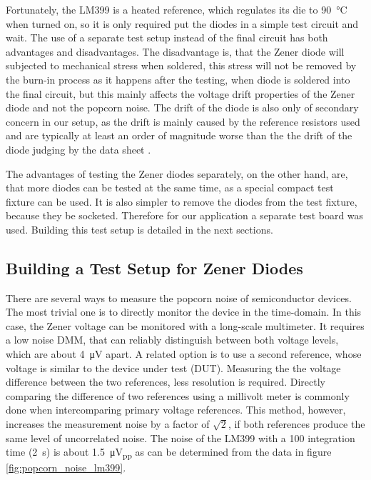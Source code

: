 Fortunately, the LM399 is a heated reference, which regulates its die to \qty{90}{\celsius} when turned on, so it is only required put the diodes in a simple test circuit and wait. The use of a separate test setup instead of the final circuit has both advantages and disadvantages. The disadvantage is, that the Zener diode will subjected to mechanical stress when soldered, this stress will not be removed by the burn-in process as it happens after the testing, when diode is soldered into the final circuit, but this mainly affects the voltage drift properties of the Zener diode and not the popcorn noise. The drift of the diode is also only of secondary concern in our setup, as the drift is mainly caused by the reference resistors used and are typically at least an order of magnitude worse than the the drift of the diode judging by the data sheet \cite{datasheet_LM399,datasheet_VPR}.

The advantages of testing the Zener diodes separately, on the other hand, are, that more diodes can be tested at the same time, as a special compact test fixture can be used. It is also simpler to remove the diodes from the test fixture, because they be socketed. Therefore for our application a separate test board was used. Building this test setup is detailed in the next sections.

\subsection{Building a Test Setup for Zener Diodes}
There are several ways to measure the popcorn noise of semiconductor devices. The most trivial one is to directly monitor the device in the time-domain. In this case, the Zener voltage can be monitored with a long-scale multimeter. It requires a low noise DMM, that can reliably distinguish between both voltage levels, which are about \qty{4}{\micro \volt} apart.
A related option is to use a second reference, whose voltage is similar to the device under test (DUT). Measuring the the voltage difference between the two references, less resolution is required. Directly comparing the difference of two references using a millivolt meter is commonly done when intercomparing primary voltage references. This method, however, increases the measurement noise by a factor of $\sqrt{2}$, if both references produce the same level of uncorrelated noise. The noise of the LM399 with a \qty{100}{\plc} integration time (\qty{2}{\second}) is about \qty{1.5}{\micro \volt_{pp}} as can be determined from the data in figure \ref{fig:popcorn_noise_lm399}.

